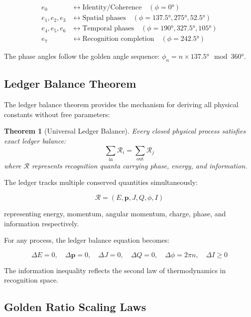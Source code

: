 \documentclass[12pt,a4paper]{article}
\newtheorem{theorem}{Theorem}
\begin{document}
\begin{align}
e_0 &\leftrightarrow \text{Identity/Coherence} \quad (\phi = 0°) \\
e_1, e_2, e_3 &\leftrightarrow \text{Spatial phases} \quad (\phi = 137.5°, 275°, 52.5°) \\
e_4, e_5, e_6 &\leftrightarrow \text{Temporal phases} \quad (\phi = 190°, 327.5°, 105°) \\
e_7 &\leftrightarrow \text{Recognition completion} \quad (\phi = 242.5°)
\end{align}

The phase angles follow the golden angle sequence: $\phi_n = n \times 137.5° \mod 360°$.

\subsection{Ledger Balance Theorem}

The ledger balance theorem provides the mechanism for deriving all physical constants without free parameters:

\begin{theorem}[Universal Ledger Balance]
Every closed physical process satisfies exact ledger balance:
\begin{equation}
\sum_{\text{in}} \mathcal{R}_i = \sum_{\text{out}} \mathcal{R}_j
\end{equation}
where $\mathcal{R}$ represents recognition quanta carrying phase, energy, and information.
\end{theorem}

The ledger tracks multiple conserved quantities simultaneously:

\begin{equation}
\mathcal{R} = (E, \mathbf{p}, J, Q, \phi, I)
\end{equation}

representing energy, momentum, angular momentum, charge, phase, and information respectively.

For any process, the ledger balance equation becomes:

\begin{equation}
\Delta E = 0, \quad \Delta \mathbf{p} = 0, \quad \Delta J = 0, \quad \Delta Q = 0, \quad \Delta \phi = 2\pi n, \quad \Delta I \geq 0
\end{equation}

The information inequality reflects the second law of thermodynamics in recognition space.

\subsection{Golden Ratio Scaling Laws}
\end{document}

